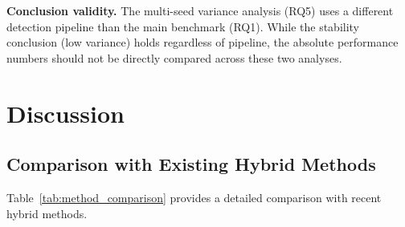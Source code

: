 \documentclass[research]{fcs}
\begin{document}
\textbf{Conclusion validity.} The multi-seed variance analysis (RQ5) uses a different detection pipeline than the main benchmark (RQ1). While the stability conclusion (low variance) holds regardless of pipeline, the absolute performance numbers should not be directly compared across these two analyses.

\section{Discussion}

\subsection{Comparison with Existing Hybrid Methods}

Table~\ref{tab:method_comparison} provides a detailed comparison with recent hybrid methods.
\end{document}
